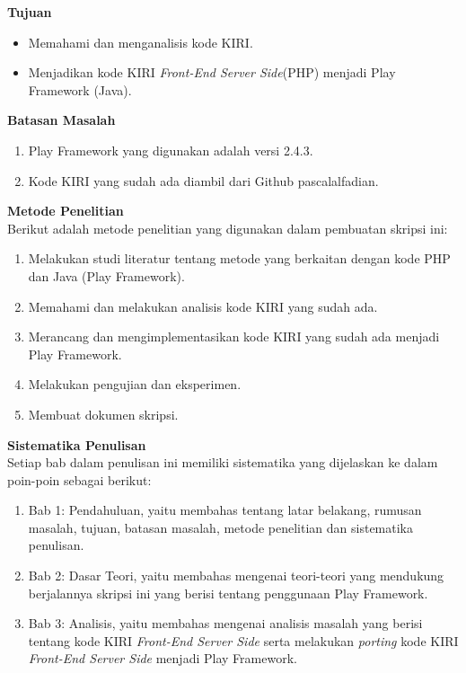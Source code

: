 \documentclass[a4paper,twoside]{article}
\begin{document}
\begin{enumerate}
\textbf{Tujuan}
\begin{itemize}
	\item Memahami dan menganalisis kode KIRI.
	\item Menjadikan kode KIRI \textit{Front-End Server Side}(PHP) menjadi Play Framework (Java).
\end{itemize}

\textbf{Batasan Masalah}
\begin{enumerate}
	\item Play Framework yang digunakan adalah versi 2.4.3.
	\item Kode KIRI yang sudah ada diambil dari Github pascalalfadian\cite{githubkiri}.
\end{enumerate}

\textbf{Metode Penelitian}\\
Berikut adalah metode penelitian yang digunakan dalam pembuatan skripsi ini:
	\begin{enumerate}
		\item Melakukan studi literatur tentang metode yang berkaitan dengan kode PHP dan Java (Play Framework).
		\item Memahami dan melakukan analisis kode KIRI yang sudah ada.
		\item Merancang dan mengimplementasikan kode KIRI yang sudah ada menjadi Play Framework.
		\item Melakukan pengujian dan eksperimen.
		\item Membuat dokumen skripsi.
	\end{enumerate}
	
\textbf{Sistematika Penulisan}\\
Setiap bab dalam penulisan ini memiliki sistematika yang dijelaskan ke dalam poin-poin sebagai berikut:
	\begin{enumerate}
		\item Bab 1: Pendahuluan, yaitu membahas tentang latar belakang, rumusan masalah, tujuan, batasan masalah, metode penelitian dan sistematika penulisan.
		\item Bab 2: Dasar Teori, yaitu membahas mengenai teori-teori yang mendukung berjalannya skripsi ini yang berisi tentang penggunaan Play Framework.
		\item Bab 3: Analisis, yaitu membahas mengenai analisis masalah yang berisi tentang kode KIRI \textit{Front-End Server Side} serta melakukan \textit{porting} kode KIRI \textit{Front-End Server Side} menjadi Play Framework.
	\end{enumerate}
	

\end{enumerate}
\end{document}
